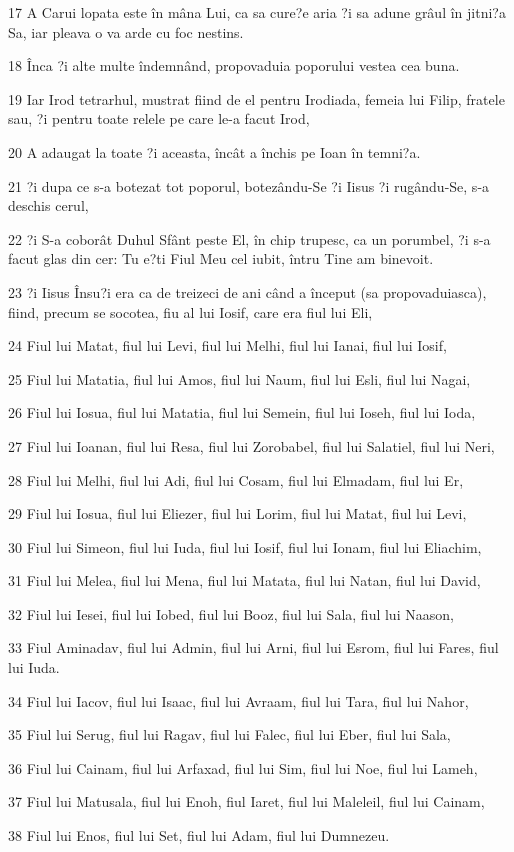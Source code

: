 \par 17 A Carui lopata este în mâna Lui, ca sa cure?e aria ?i sa adune grâul în jitni?a Sa, iar pleava o va arde cu foc nestins.
\par 18 Înca ?i alte multe îndemnând, propovaduia poporului vestea cea buna.
\par 19 Iar Irod tetrarhul, mustrat fiind de el pentru Irodiada, femeia lui Filip, fratele sau, ?i pentru toate relele pe care le-a facut Irod,
\par 20 A adaugat la toate ?i aceasta, încât a închis pe Ioan în temni?a.
\par 21 ?i dupa ce s-a botezat tot poporul, botezându-Se ?i Iisus ?i rugându-Se, s-a deschis cerul,
\par 22 ?i S-a coborât Duhul Sfânt peste El, în chip trupesc, ca un porumbel, ?i s-a facut glas din cer: Tu e?ti Fiul Meu cel iubit, întru Tine am binevoit.
\par 23 ?i Iisus Însu?i era ca de treizeci de ani când a început (sa propovaduiasca), fiind, precum se socotea, fiu al lui Iosif, care era fiul lui Eli,
\par 24 Fiul lui Matat, fiul lui Levi, fiul lui Melhi, fiul lui Ianai, fiul lui Iosif,
\par 25 Fiul lui Matatia, fiul lui Amos, fiul lui Naum, fiul lui Esli, fiul lui Nagai,
\par 26 Fiul lui Iosua, fiul lui Matatia, fiul lui Semein, fiul lui Ioseh, fiul lui Ioda,
\par 27 Fiul lui Ioanan, fiul lui Resa, fiul lui Zorobabel, fiul lui Salatiel, fiul lui Neri,
\par 28 Fiul lui Melhi, fiul lui Adi, fiul lui Cosam, fiul lui Elmadam, fiul lui Er,
\par 29 Fiul lui Iosua, fiul lui Eliezer, fiul lui Lorim, fiul lui Matat, fiul lui Levi,
\par 30 Fiul lui Simeon, fiul lui Iuda, fiul lui Iosif, fiul lui Ionam, fiul lui Eliachim,
\par 31 Fiul lui Melea, fiul lui Mena, fiul lui Matata, fiul lui Natan, fiul lui David,
\par 32 Fiul lui Iesei, fiul lui Iobed, fiul lui Booz, fiul lui Sala, fiul lui Naason,
\par 33 Fiul Aminadav, fiul lui Admin, fiul lui Arni, fiul lui Esrom, fiul lui Fares, fiul lui Iuda.
\par 34 Fiul lui Iacov, fiul lui Isaac, fiul lui Avraam, fiul lui Tara, fiul lui Nahor,
\par 35 Fiul lui Serug, fiul lui Ragav, fiul lui Falec, fiul lui Eber, fiul lui Sala,
\par 36 Fiul lui Cainam, fiul lui Arfaxad, fiul lui Sim, fiul lui Noe, fiul lui Lameh,
\par 37 Fiul lui Matusala, fiul lui Enoh, fiul Iaret, fiul lui Maleleil, fiul lui Cainam,
\par 38 Fiul lui Enos, fiul lui Set, fiul lui Adam, fiul lui Dumnezeu.

